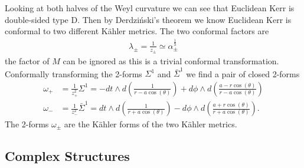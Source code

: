 \documentclass[10pt]{report}
\newcommand{\derd}[0]{Derdzi\'nski}
\theoremstyle{definition}
\begin{document}
Looking at both halves of the Weyl curvature we can see that Euclidean Kerr is double-sided type D. Then by \derd{}'s theorem we know Euclidean Kerr is conformal to two different K\"ahler metrics. The two conformal factors are 
\begin{align}
    \lambda_\pm = \frac{1}{z_\pm} \simeq \alpha_\pm^{\frac{1}{3}} \label{eq:KerrConformalFactors}
\end{align}
the factor of $M$ can be ignored as this is a trivial conformal transformation. Conformally transforming the 2-forms $\Sigma^1$ and $\bar{\Sigma}^1$ we find a pair of closed 2-forms 
\begin{align}
    \omega_+ &= \frac{1}{z_+^2} \Sigma^1 = -dt \wedge d\left( \frac{1}{r-a\cos(\theta)} \right) + d\phi \wedge d\left( \frac{a-r\cos(\theta)}{r-a\cos(\theta)} \right) \\[10pt]
    \omega_- &= \frac{1}{z_-^2} \bar{\Sigma}^1 = dt \wedge d\left( \frac{1}{r+a\cos(\theta)} \right) - d\phi \wedge d \left( \frac{a + r\cos(\theta)}{r+a\cos(\theta)} \right).
\end{align}
The 2-forms $\omega_\pm$ are the K\"ahler forms of the two K\"ahler metrics.

\subsection{Complex Structures}
\end{document}
